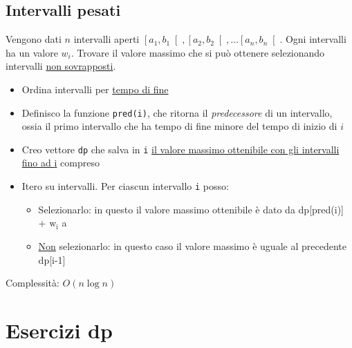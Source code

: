 \subsection{Intervalli pesati}\label{intervalli pesati}
Vengono dati $ n $ intervalli aperti $ \left[a_1, b_1\right[, \left[a_2, b_2\right[ , \ldots  \left[a_n, b_n\right[ $. Ogni intervalli ha un valore $ w_i $. Trovare il valore massimo che si può ottenere selezionando intervalli \underline{non sovrapposti}.

\vskip3mm\vskip3mm
\begin{itemize}
	\item Ordina intervalli per \underline{tempo di fine}
	\item Definisco la funzione \verb|pred(i)|, che ritorna il \textit{predecessore} di un intervallo, ossia il primo intervallo che ha tempo di fine minore del tempo di inizio di $ i $
	\item Creo vettore \verb|dp| che salva in \verb|i| \underline{il valore massimo ottenibile con gli intervalli fino ad {\ttfamily i}} compreso
	\item Itero su intervalli. Per ciascun intervallo \verb|i| posso:
	      \begin{itemize}
		      \item Selezionarlo: in questo il valore massimo ottenibile è dato da {\ttfamily dp[pred(i)] + $ \text{w}_{\text{i}} $} a
		      \item \underline{Non} selezionarlo: in questo caso il valore massimo è uguale al precedente {\ttfamily dp[i-1]}
	      \end{itemize}
\end{itemize}
Complessità: $ O\left(n \log n\right) $

\section{Esercizi dp}

